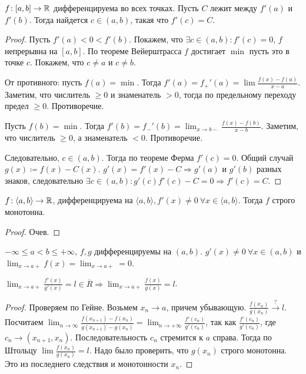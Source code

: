 \begin{theorem}
    $f\!:[a, b] \to \mathbb{R}$ дифференцируема во всех точках. Пусть  $C$ лежит между  $f'(a)$ и  $f'(b)$. Тогда найдется  $c \in (a, b)$, такая что  $f'(c) = C$.
\end{theorem}
\begin{proof}
    Пусть $f'(a) < 0 < f'(b)$. Покажем, что $\exists c \in (a, b)\!: f'(c) = 0$, $f$ непрерывна на  $[a, b]$. По теореме Вейерштрасса  $f$ достигает  $\min$ пусть это в точке $c$. Покажем, что  $c \neq a$ и  $c \neq b$. 

    От противного: пусть $f(a) = \min$. Тогда  $f'(a) = f_+'(a) = \lim \frac{f(x) - f(a)}{x-a}$. Заметим, что числитель  $\ge 0$ и знаменатель $> 0$, тогда по предельному переходу предел  $\ge 0$. Противоречие.

    Пусть $f(b) = \min$. Тогда  $f'(b) = f_-'(b) = \lim_{x \to b-} \frac{f(x) - f(b)}{x - b}$. Заметим, что  числитель  $\ge 0$, а знаменатель $<0$. Противоречие.
    
    Следовательно,  $c \in (a, b)$. Тогда по теореме Ферма  $f'(c) = 0$. Общий случай  $g(x) \coloneqq f(x) - C(x)$.  $g'(x) = f'(x) - C \Rightarrow g'(a)$ и  $g'(b)$ разных знаков, следовательно  $\exists c \in (a, b)\!: g'(c) f'(c) - C = 0 \Rightarrow f'(c) = C$.
\end{proof}
\begin{consequence}
    $f\!: \langle a, b \rangle \to \mathbb{R}$, дифференцируема на  $\langle a, b \rangle, f'(x) \neq 0\ \forall x \in \langle a, b \rangle $. Тогда  $f$ строго монотонна.
\end{consequence}
\begin{proof}
    Очев. 
\end{proof}
\begin{theorem}
    $-\infty \le a < b \le +\infty$, $f,g$ дифференцируемы на  $(a, b)$.  $g'(x) \neq 0\ \forall x \in (a, b)$ и $\lim_{x \to a+} f(x) = \lim_{x \to a+} = 0$. 

    $\lim_{x \to a+} \frac{f'(x)}{g'(x)} = l \in \overline{R} \Rightarrow \lim_{x \to a+} \frac{f(x)}{g(x)} = l$. 
\end{theorem}
\begin{proof}
    Проверяем по Гейне. Возьмем $x_n \to a$, причем убывающую.  $\frac{f(x_n)}{g(x_n)} \xrightarrow{?} l$. Посчитаем $\lim_{n \to \infty} \frac{f(x_{n+1}) - f(x_n)}{g(x_{n+1}) - g(x_n)} = \lim_{n \to +\infty} \frac{f'(c_n)}{g'(c_n)}$, так как $\frac{f'(c_n)}{g'(c_n)}$, где $c_n \to (x_{n+1}, x_n)$. Последовательность  $c_n$ стремится  к $a$ справа. Тогда по Штольцу $\lim \frac{f(x_n)}{g(x_n)} = l$. Надо было проверить, что $g(x_n)$ строго монотонна. Это из последнего следствия и монотонности $x_n$.
\end{proof}
